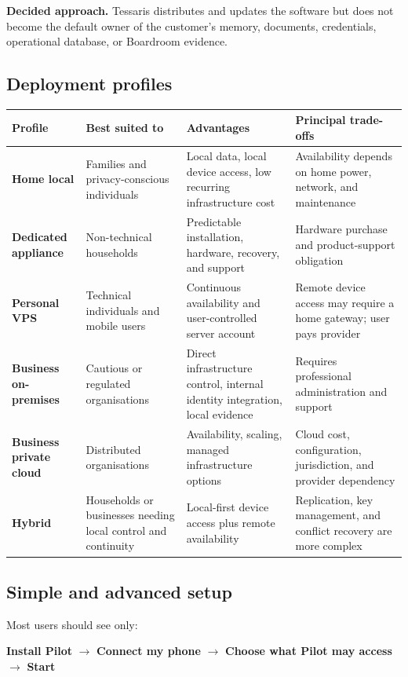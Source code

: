 \documentclass[11pt,a4paper]{article}
\newcommand{\decision}[1]{%
  \par\medskip\noindent
  \colorbox{pilotblue!9}{\parbox{0.94\linewidth}{\textbf{Decided approach.} #1}}%
  \par\medskip}
\begin{document}
\decision{Tessaris distributes and updates the software but does not become the
default owner of the customer's memory, documents, credentials, operational
database, or Boardroom evidence.}

\subsection{Deployment profiles}

\begin{longtable}{@{}>{\bfseries}p{27mm}p{40mm}p{45mm}p{36mm}@{}}
\toprule
Profile & Best suited to & Advantages & Principal trade-offs \\
\midrule
Home local & Families and privacy-conscious individuals & Local data, local device access, low recurring infrastructure cost & Availability depends on home power, network, and maintenance \\
Dedicated appliance & Non-technical households & Predictable installation, hardware, recovery, and support & Hardware purchase and product-support obligation \\
Personal VPS & Technical individuals and mobile users & Continuous availability and user-controlled server account & Remote device access may require a home gateway; user pays provider \\
Business on-premises & Cautious or regulated organisations & Direct infrastructure control, internal identity integration, local evidence & Requires professional administration and support \\
Business private cloud & Distributed organisations & Availability, scaling, managed infrastructure options & Cloud cost, configuration, jurisdiction, and provider dependency \\
Hybrid & Households or businesses needing local control and continuity & Local-first device access plus remote availability & Replication, key management, and conflict recovery are more complex \\
\bottomrule
\end{longtable}

\subsection{Simple and advanced setup}

Most users should see only:

\begin{center}
\textbf{Install Pilot} $\rightarrow$ \textbf{Connect my phone} $\rightarrow$
\textbf{Choose what Pilot may access} $\rightarrow$ \textbf{Start}
\end{center}
\end{document}
